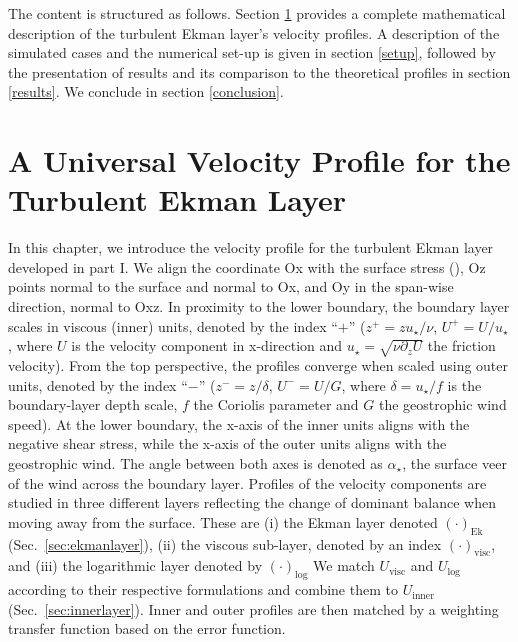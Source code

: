 \documentclass[smallcondensed,draft]{svjour3}
\newcommand{\p}{\partial}
\begin{document}
The content is structured as follows. Section \ref{universal_profile} provides a complete mathematical description of the turbulent Ekman layer's velocity profiles. A description of the simulated cases and the numerical set-up is given in section \ref{setup}, followed by the presentation of results and its comparison to the theoretical profiles in section \ref{results}. We conclude in section \ref{conclusion}.

\section{A Universal Velocity Profile for the Turbulent Ekman Layer}
\label{universal_profile}

In this chapter, we introduce the velocity profile for the turbulent Ekman layer developed in part I. 
We align the coordinate Ox with the surface stress (\cite{ansorge:BM2019}), Oz points normal to the surface and normal to Ox, and Oy in the span-wise direction, normal to Oxz. In proximity to the lower boundary, the boundary layer scales in viscous (inner) units, denoted by the index ``$+$'' ($z^+ = zu_\star/\nu$, $U^+=U/u_\star$, where $U$ is the velocity component in x-direction and $u_\star = \sqrt{\nu \p_z U}$ the friction velocity). From the top perspective, the profiles converge when scaled using outer units, denoted by the index ``$-$'' ($z^-=z/\delta$, $U^-=U/G$, where $\delta=u_\star/f$ is the boundary-layer depth scale, $f$ the Coriolis parameter and $G$ the geostrophic wind speed). 
At the lower boundary, the x-axis of the inner units aligns with the negative shear stress, while the x-axis of the outer units aligns with the geostrophic wind. The angle between both axes is denoted as $\alpha_\star$, the surface veer of the wind across the boundary layer. 
%
Profiles of the velocity components are studied in three different layers reflecting the change of dominant balance when moving away from the surface. These are
(i) the Ekman layer denoted $(\cdot)_\text{Ek}$ (Sec.~\ref{sec:ekmanlayer}), 
(ii) the viscous sub-layer, denoted by an index $(\cdot)_\text{visc}$, 
and (iii) the logarithmic layer denoted by $(\cdot)_\text{log}$
We match $U_\text{visc}$ and $U_\text{log}$ according to their respective formulations and combine them to $U_\text{inner}$ (Sec.~\ref{sec:innerlayer}).
Inner and outer profiles are then matched by a weighting transfer function based on the error function. 
\end{document}
